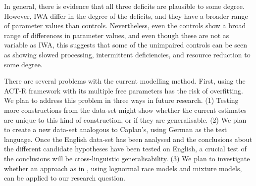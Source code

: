 \documentclass[10pt,letterpaper]{article}
\begin{document}
In general, there is evidence that all three deficits are plausible to some degree. However, IWA differ in the degree of the deficits, and they have a broader range of parameter values than controls.
Nevertheless, even the controls show a broad range of differences in parameter values, and even though these are not as variable as IWA, this suggests that some of the unimpaired controls can be seen as showing slowed processing, intermittent deficiencies, and resource reduction to some degree.   

There are several problems with the current modelling method. First, using the ACT-R framework with its multiple free parameters has the risk of overfitting. We plan to address this problem in three ways in future research. (1) Testing more constructions from the  data-set might show whether the current estimates are unique to this kind of construction, or if they are generalisable. (2) We plan to create a new data-set analogous to Caplan's, using German as the test language. Once the English data-set has been analysed and the conclusions about the different candidate hypotheses have been tested on English, a crucial test of the conclusions will be cross-linguistic generalisability.
(3) We plan to investigate whether an approach as in , using lognormal race models and mixture models, can be applied to our research question. 

\end{document}
